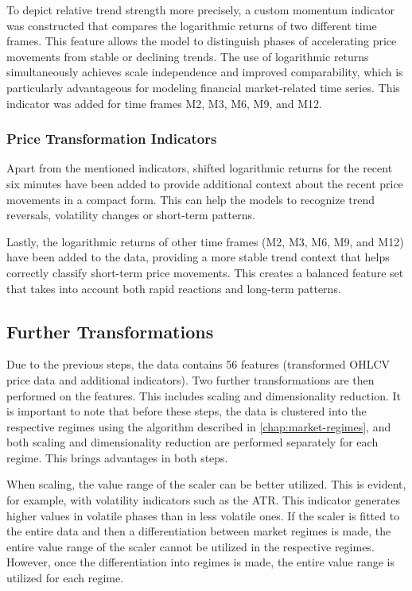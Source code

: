 To depict relative trend strength more precisely, a custom momentum indicator was constructed that compares the logarithmic returns of two different time frames.
This feature allows the model to distinguish phases of accelerating price movements from stable or declining trends.
The use of logarithmic returns simultaneously achieves scale independence and improved comparability, which is particularly advantageous for modeling financial market-related time series.
This indicator was added for time frames M2, M3, M6, M9, and M12.

\subsubsection{Price Transformation Indicators}

Apart from the mentioned indicators, shifted logarithmic returns for the recent six minutes have been added to provide additional context about the recent price movements in a compact form.
This can help the models to recognize trend reversals, volatility changes or short-term patterns.

Lastly, the logarithmic returns of other time frames (M2, M3, M6, M9, and M12) have been added to the data, providing a more stable trend context that helps correctly classify short-term price movements.
This creates a balanced feature set that takes into account both rapid reactions and long-term patterns.

\subsection{Further Transformations}

Due to the previous steps, the data contains 56 features (transformed OHLCV price data and additional indicators).
Two further transformations are then performed on the features.
This includes scaling and dimensionality reduction.
It is important to note that before these steps, the data is clustered into the respective regimes using the algorithm described in \autoref{chap:market-regimes}, and both scaling and dimensionality reduction are performed separately for each regime.
This brings advantages in both steps.

When scaling, the value range of the scaler can be better utilized.
This is evident, for example, with volatility indicators such as the ATR.
This indicator generates higher values in volatile phases than in less volatile ones.
If the scaler is fitted to the entire data and then a differentiation between market regimes is made, the entire value range of the scaler cannot be utilized in the respective regimes.
However, once the differentiation into regimes is made, the entire value range is utilized for each regime.

